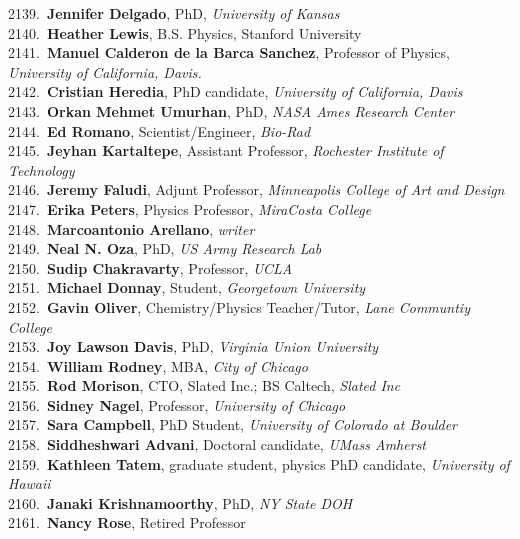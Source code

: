 2139.~{\bf Jennifer Delgado}, PhD, {\sl University of Kansas} \\
2140.~{\bf Heather Lewis}, B.S. Physics, Stanford University \\
2141.~{\bf Manuel Calderon de la Barca Sanchez}, Professor of Physics, {\sl University of California, Davis.} \\
2142.~{\bf Cristian Heredia}, PhD candidate, {\sl University of California, Davis} \\
2143.~{\bf Orkan Mehmet Umurhan}, PhD, {\sl NASA Ames Research Center} \\
2144.~{\bf Ed Romano}, Scientist/Engineer, {\sl Bio-Rad} \\
2145.~{\bf Jeyhan Kartaltepe}, Assistant Professor, {\sl Rochester Institute of Technology} \\
2146.~{\bf Jeremy Faludi}, Adjunt Professor, {\sl Minneapolis College of Art and Design} \\
2147.~{\bf Erika Peters}, Physics Professor, {\sl MiraCosta College} \\
2148.~{\bf Marcoantonio Arellano}, {\sl writer} \\
2149.~{\bf Neal N. Oza}, PhD, {\sl US Army Research Lab} \\
2150.~{\bf Sudip Chakravarty}, Professor, {\sl UCLA} \\
2151.~{\bf Michael Donnay}, Student, {\sl Georgetown University} \\
2152.~{\bf Gavin Oliver}, Chemistry/Physics Teacher/Tutor, {\sl Lane Communtiy College} \\
2153.~{\bf Joy Lawson Davis}, PhD, {\sl Virginia Union University} \\
2154.~{\bf William Rodney}, MBA, {\sl City of Chicago} \\
2155.~{\bf Rod Morison}, CTO, Slated Inc.; BS Caltech, {\sl Slated Inc} \\
2156.~{\bf Sidney Nagel}, Professor, {\sl University of Chicago} \\
2157.~{\bf Sara Campbell}, PhD Student, {\sl University of Colorado at Boulder} \\
2158.~{\bf Siddheshwari Advani}, Doctoral candidate, {\sl UMass Amherst} \\
2159.~{\bf Kathleen Tatem}, graduate student, physics PhD candidate, {\sl University of Hawaii} \\
2160.~{\bf Janaki Krishnamoorthy}, PhD, {\sl NY State DOH} \\
2161.~{\bf Nancy Rose}, Retired Professor \\
